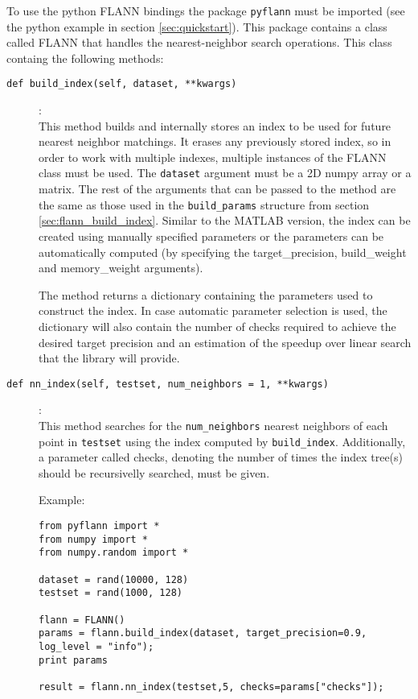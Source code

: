 \documentclass[letter,10pt]{article}
\begin{document}
To use the python FLANN bindings the package \texttt{pyflann} must be imported
(see the python example in section \ref{sec:quickstart}). This package contains
a class called FLANN that handles the nearest-neighbor search operations. This
class containg the following methods:
\begin{description}
\item [\texttt{def build\_index(self, dataset, **kwargs)}] :\\
    This method builds and internally stores an index to be used for future
nearest neighbor matchings. It erases any previously stored index, so in order
to work with multiple indexes, multiple instances of the FLANN class must be
used. The \texttt{dataset} argument must be a 2D numpy array or a matrix. The
rest of the arguments that can be passed to the method are the same as
 those used in the \texttt{build\_params} structure from
section \ref{sec:flann_build_index}. Similar to the MATLAB version, the index
can be created using manually specified parameters or the parameters can be
automatically computed (by specifying the target\_precision, build\_weight and
memory\_weight arguments).

The method returns a dictionary containing the parameters used to construct the
index. In case automatic parameter selection is used, the dictionary will also
contain the number of checks required to achieve the desired target precision
and an estimation of the speedup over linear search that the library will
provide.


\item [\texttt{def nn\_index(self, testset, num\_neighbors = 1, **kwargs)}] :\\
    This method searches for the \texttt{num\_neighbors} nearest neighbors of
each point in \texttt{testset} using the index computed by
\texttt{build\_index}. Additionally, a parameter called checks, denoting the
number of times the index tree(s) should be recursivelly searched, must be
given.

Example:
\begin{Verbatim}[fontsize=\scriptsize,frame=single]
from pyflann import *
from numpy import *
from numpy.random import *

dataset = rand(10000, 128)
testset = rand(1000, 128)

flann = FLANN()
params = flann.build_index(dataset, target_precision=0.9, log_level = "info");
print params

result = flann.nn_index(testset,5, checks=params["checks"]);
\end{Verbatim}


\end{description}
\end{document}
